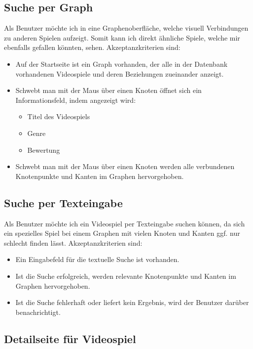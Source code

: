 \documentclass[a4paper, 10pt, conference]{IEEEtran}
\begin{document}
\subsection{Suche per Graph}

Als Benutzer möchte ich in eine Graphenoberfläche, welche visuell Verbindungen zu anderen Spielen aufzeigt. Somit kann ich direkt ähnliche Spiele, welche mir ebenfalls gefallen könnten, sehen. Akzeptanzkriterien sind:
\begin{itemize}
	\item Auf der Startseite ist ein Graph vorhanden, der alle in der Datenbank vorhandenen Videospiele und deren Beziehungen zueinander anzeigt.
    \item Schwebt man mit der Maus über einen Knoten öffnet sich ein Informationsfeld, indem angezeigt wird:
    \begin{itemize}
      \item Titel des Videospiels
      \item Genre
      \item Bewertung
    \end{itemize}
    \item Schwebt man mit der Maus über einen Knoten werden alle verbundenen Knotenpunkte und Kanten im Graphen hervorgehoben.
\end{itemize}


\subsection{Suche per Texteingabe}

Als Benutzer möchte ich ein Videospiel per Texteingabe suchen können, da sich ein spezielles Spiel bei einem Graphen mit vielen Knoten und Kanten ggf. nur schlecht finden lässt. Akzeptanzkriterien sind:
\begin{itemize}
    \item Ein Eingabefeld für die textuelle Suche ist vorhanden.
    \item Ist die Suche erfolgreich, werden relevante Knotenpunkte und Kanten im Graphen hervorgehoben.
    \item Ist die Suche fehlerhaft oder liefert kein Ergebnis, wird der Benutzer darüber benachrichtigt.
\end{itemize}


\subsection{Detailseite für Videospiel}
\end{document}
